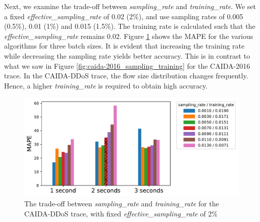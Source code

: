 		Next, we examine the trade-off between \emph{sampling\_rate} and \emph{training\_rate}. We set a fixed \emph{effective\_sampling\_rate} of 0.02 (2\%), and use sampling rates of 0.005 (0.5\%), 0.01 (1\%) and 0.015 (1.5\%). The training rate is calculated such that the \emph{effective\_sampling\_rate} remains 0.02. Figure \ref{fig:caida-ddos_sampling_training} shows the MAPE for the various algorithms for three batch sizes. It is evident that increasing the training rate while decreasing the sampling rate yields better accuracy. This is in contrast to what we saw in Figure \ref{fig:caida-2016_sampling_training} for the CAIDA-2016 trace. In the CAIDA-DDoS trace, the flow size distribution changes frequently. Hence, a higher \emph{training\_rate} is required to obtain high accuracy.
		\begin{figure}[!t]
			\centering
			\includegraphics[width=.49\textwidth]{img/caida-ddos_tradeoff_new.pdf}
			\caption{The trade-off between \emph{sampling\_rate} and \emph{training\_rate} for the CAIDA-DDoS trace, with fixed \emph{effective\_sampling\_rate} of 2\%}
			\label{fig:caida-ddos_sampling_training}
		\end{figure}

